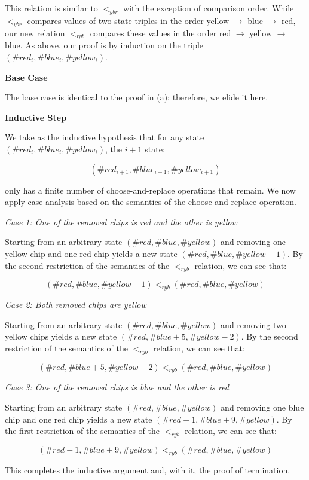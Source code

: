 \documentclass{article}
\begin{document}
\noindent This relation is similar to $<_{ybr}$ with the exception of comparison order. While $<_{ybr}$ compares values of two state triples in the order yellow $\rightarrow$ blue $\rightarrow$ red, our new relation $<_{ryb}$ compares these values in the order red $\rightarrow$ yellow $\rightarrow$ blue. As above, our proof is by induction on the triple $(\#red_i, \#blue_i, \#yellow_i)$.

\medskip
\noindent \textbf{Base Case}

\medskip
\noindent The base case is identical to the proof in (a); therefore, we elide it here.

\medskip
\noindent \textbf{Inductive Step}

\medskip
\noindent We take as the inductive hypothesis that for any state $(\#red_i, \#blue_i, \#yellow_i)$, the $i + 1$ state:

$$(\#red_{i + 1}, \#blue_{i + 1}, \#yellow_{i + 1})$$

\noindent only has a finite number of choose-and-replace operations that remain. We now apply case analysis based on the semantics of the choose-and-replace operation.

\medskip
\noindent \emph{Case 1: One of the removed chips is red and the other is yellow}

\medskip
\noindent Starting from an arbitrary state $(\#red, \#blue, \#yellow)$ and removing one yellow chip and one red chip yields a new state $(\#red, \#blue, \#yellow - 1)$. By the second restriction of the semantics of the $<_{ryb}$ relation, we can see that:

$$
(\#red, \#blue, \#yellow - 1) <_{ryb} (\#red, \#blue, \#yellow)
$$

\medskip
\noindent \emph{Case 2: Both removed chips are yellow}

\medskip
\noindent Starting from an arbitrary state $(\#red, \#blue, \#yellow)$ and removing two yellow chips yields a new state $(\#red , \#blue + 5, \#yellow - 2)$. By the second restriction of the semantics of the $<_{ryb}$ relation, we can see that:

$$
(\#red, \#blue + 5, \#yellow - 2) <_{ryb} (\#red, \#blue, \#yellow)
$$

\medskip
\noindent \emph{Case 3: One of the removed chips is blue and the other is red}

\medskip
\noindent Starting from an arbitrary state $(\#red, \#blue, \#yellow)$ and removing one blue chip and one red chip yields a new state $(\#red - 1, \#blue + 9, \#yellow)$. By the first restriction of the semantics of the $<_{ryb}$ relation, we can see that:

$$
(\#red - 1, \#blue + 9, \#yellow) <_{ryb} (\#red, \#blue, \#yellow)
$$

\medskip
\noindent This completes the inductive argument and, with it, the proof of termination.
\end{document}
